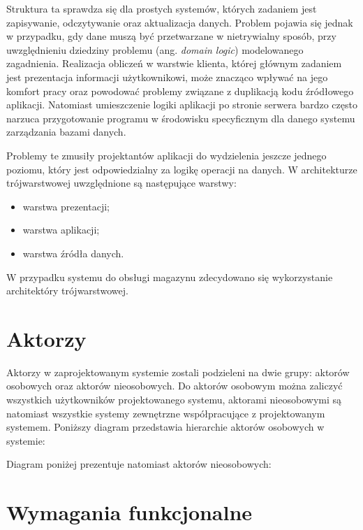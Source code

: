 Struktura ta sprawdza się dla prostych systemów, których zadaniem jest
zapisywanie, odczytywanie oraz aktualizacja danych. Problem
pojawia się jednak w przypadku, gdy dane muszą być przetwarzane w
nietrywialny sposób, przy uwzględnieniu dziedziny problemu (ang. \emph{domain
logic}) modelowanego zagadnienia. Realizacja obliczeń w warstwie klienta,
której głównym zadaniem jest prezentacja informacji użytkownikowi, może
znacząco wpływać na jego komfort pracy oraz powodować problemy związane z
duplikacją kodu źródłowego aplikacji.
Natomiast umieszczenie logiki aplikacji po stronie serwera bardzo często narzuca
przygotowanie programu w środowisku specyficznym dla danego systemu zarządzania
bazami danych. 

Problemy te zmusiły projektantów aplikacji do wydzielenia jeszcze jednego
poziomu, który jest odpowiedzialny za logikę operacji na danych. W
architekturze trójwarstwowej uwzględnione są następujące warstwy:
\begin{itemize}
 \item warstwa prezentacji;
 \item warstwa aplikacji;
 \item warstwa źródła danych.
\end{itemize}


W przypadku systemu do obsługi magazynu zdecydowano się wykorzystanie
architektóry trójwarstwowej.

\section{Aktorzy}

Aktorzy w zaprojektowanym systemie zostali podzieleni na dwie grupy: aktorów
osobowych oraz aktorów nieosobowych. Do aktorów osobowym można zaliczyć
wszystkich użytkowników projektowanego systemu, aktorami nieosobowymi są
natomiast wszystkie systemy zewnętrzne współpracujące z projektowanym systemem.
Poniższy diagram przedstawia hierarchie aktorów osobowych w systemie:


Diagram poniżej prezentuje natomiast aktorów nieosobowych:



\section{Wymagania funkcjonalne}

